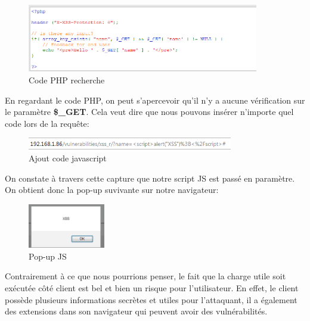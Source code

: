 \begin{figure}[htp!]
  \centering
  \setlength\figureheight{7cm}
  \setlength\figurewidth{9cm}
  \includegraphics[width=0.9\textwidth]{oui/images/xss/xss2.PNG}
  \caption{Code PHP recherche}
  \label{fig:courbe-tikz}
\end{figure}

En regardant le code PHP, on peut s'apercevoir qu'il n'y a aucune vérification sur le paramètre \textbf{\$\_GET}. Cela veut dire que nous pouvons insérer n'importe quel code lors de la requête:

\begin{figure}[htp!]
  \centering
  \setlength\figureheight{7cm}
  \setlength\figurewidth{9cm}
  \includegraphics[width=0.8\textwidth]{oui/images/xss/xss4.PNG}
  \caption{Ajout code javascript}
  \label{fig:courbe-tikz}
\end{figure}

On constate à travers cette capture que notre script JS est passé en paramètre. On obtient donc la pop-up suvivante sur notre navigateur:\\

\begin{figure}[htp!]
  \centering
  \setlength\figureheight{7cm}
  \setlength\figurewidth{9cm}
  \includegraphics[width=0.3\textwidth]{oui/images/xss/xss3.PNG}
  \caption{Pop-up JS}
  \label{fig:courbe-tikz}
\end{figure}

Contrairement à ce que nous pourrions penser, le fait que la charge utile soit exécutée côté client est bel et bien un risque pour l’utilisateur. En effet, le client possède plusieurs informations secrètes et utiles pour l’attaquant, il a également des extensions dans son navigateur qui peuvent avoir des vulnérabilités.

